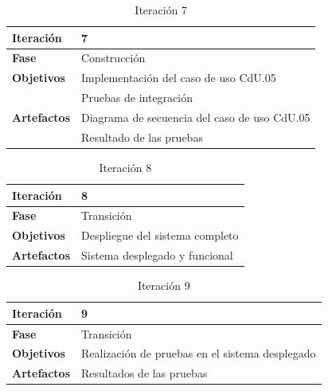 \begin{table}[htb]
    \centering
    \caption{Iteración 7}
    \label{tab:resultados.planificacion.iter.7}
    \begin{tabular}[t]{| l || p{8cm} |}
        \hline
        \textbf{Iteración} & 7 \\ \hline
        \textbf{Fase} & Construcción \\ \hline
        \multirow{1}{*}{\textbf{Objetivos}}
        & Implementación del caso de uso CdU.05 \\ \cline{2-2}
        & Pruebas de integración \\ \hline
        \multirow{1}{*}{\textbf{Artefactos}}
        & Diagrama de secuencia del caso de uso CdU.05 \\ \cline{2-2}
        & Resultado de las pruebas \\
        \hline
    \end{tabular}
\end{table}

\begin{table}[htb]
    \centering
    \caption{Iteración 8}
    \label{tab:resultados.planificacion.iter.8}
    \begin{tabular}[t]{| l || p{8cm} |}
        \hline
        \textbf{Iteración} & 8 \\ \hline
        \textbf{Fase} & Transición \\ \hline
        \multirow{1}{*}{\textbf{Objetivos}}
        & Despliegue del sistema completo \\ \hline
        \multirow{1}{*}{\textbf{Artefactos}}
        & Sistema desplegado y funcional \\
        \hline
    \end{tabular}
\end{table}

\begin{table}[htb]
    \centering
    \caption{Iteración 9}
    \label{tab:resultados.planificacion.iter.9}
    \begin{tabular}[t]{| l || p{8cm} |}
        \hline
        \textbf{Iteración} & 9 \\ \hline
        \textbf{Fase} & Transición \\ \hline
        \multirow{1}{*}{\textbf{Objetivos}}
        & Realización de pruebas en el sistema desplegado \\ \hline
        \multirow{1}{*}{\textbf{Artefactos}}
        & Resultados de las pruebas \\
        \hline
    \end{tabular}
\end{table}

